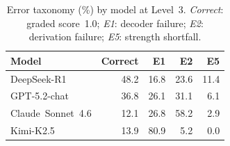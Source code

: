 \begin{table}[t]
  \centering
  \caption{Error taxonomy (\%) by model at Level~3.
           \emph{Correct}: graded score~1.0;
           \emph{E1}: decoder failure;
           \emph{E2}: derivation failure;
           \emph{E5}: strength shortfall.}
  \label{tab:error_taxonomy}
  \begin{tabular}{lrrrr}
    \toprule
    Model & Correct & E1 & E2 & E5 \\
    \midrule
    DeepSeek-R1 & 48.2 & 16.8 & 23.6 & 11.4 \\
    GPT-5.2-chat & 36.8 & 26.1 & 31.1 & 6.1 \\
    Claude~Sonnet~4.6 & 12.1 & 26.8 & 58.2 & 2.9 \\
    Kimi-K2.5 & 13.9 & 80.9 & 5.2 & 0.0 \\
    \bottomrule
  \end{tabular}
\end{table}
